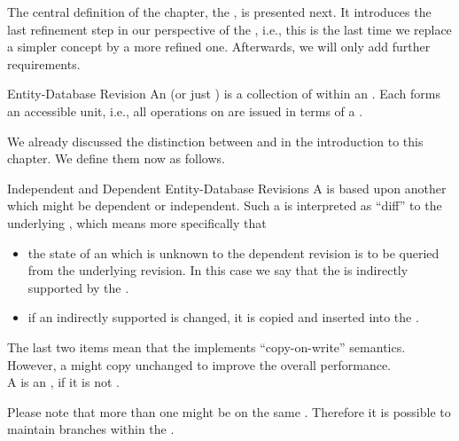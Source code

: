 \documentclass[a4paper, 12pt]{book}
\begin{document}
The central definition of the chapter, the , is
presented next. It introduces the last refinement step in our perspective of
the \SYNEIGHT, i.e., this is the last time we replace a simpler
concept by a more refined one. Afterwards, we will only add further 
requirements. 
%
\begin{definition*}{Entity-Database Revision}
  An  (or just ) is a collection of
   within an . Each  forms an
  accessible unit, i.e., all operations on  are issued in terms
  of a .
\end{definition*}
%
We already discussed the distinction between  and  in the introduction to this
chapter. We define them now as follows.
%
\begin{definition*}{Independent and Dependent Entity-Database Revisions}
  A  is based upon another
   which might be dependent or independent. Such a
   is interpreted as ``diff'' to the underlying
  , which means more specifically that
  \begin{itemize}
  \item the state of an  which is unknown to the dependent
  revision is to be queried from the underlying revision. In this case
  we say that the  is indirectly supported by the
  .
  \item if an indirectly supported  is changed, it is
  copied and inserted into the . 
  \end{itemize}
  The last two items mean that the  implements
  ``copy-on-write'' semantics. However, a 
  might copy unchanged  to improve the overall
  performance.\\
  A  is an , if
  it is not .
\end{definition*}
%
%
Please note that more than one  might be 
on the same . Therefore it is possible to maintain
branches within the . 
\end{document}
